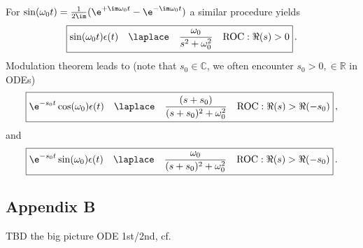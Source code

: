 \noindent For $\sin(\omega_0 t) = \frac{1}{2 \im} (\e^{+\im \omega_0 t}-\e^{-\im \omega_0 t})$ a similar
procedure yields
\begin{align}
\boxed{
\sin(\omega_0 t)\epsilon(t)\quad \laplace \quad \frac{\omega_0}{s^2 + \omega_0^2} \quad \text{ROC}: \Re(s)>0}\,.
\end{align}
%
Modulation theorem leads to (note that $s_0 \in \mathbb{C}$, we often encounter $s_0 > 0, \in \mathbb{R}$ in ODEs)
\begin{align}
\boxed{\e^{-s_0 t} \cos(\omega_0) \epsilon(t)\quad \laplace \quad \frac{(s+s_0)}{(s+s_0)^2 + \omega_0^2}\quad \text{ROC}: \Re(s)>\Re(-s_0)}\,,
\end{align}
and
\begin{align}
\boxed{\e^{-s_0 t} \sin(\omega_0) \epsilon(t)\quad \laplace \quad \frac{\omega_0}{(s+s_0)^2 + \omega_0^2}\quad \text{ROC}: \Re(s)>\Re(-s_0)}\,.
\end{align}


\newpage
\subsection*{Appendix B}
TBD the big picture ODE 1st/2nd, cf. \cite[p.117]{Strang2014}

% 
% 

